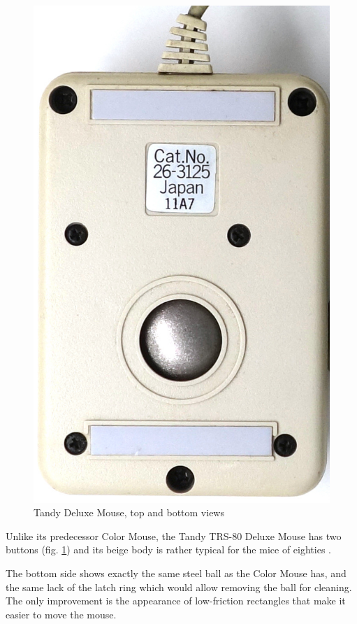 \documentclass[11pt, a4paper]{article}
\begin{document}
\begin{figure}[h]
    \includegraphics[scale=0.65]{1988_tandy_trs80_deluxe_mouse/bottom_30.jpg}
    \caption{Tandy Deluxe Mouse, top and bottom views}
    \label{fig:TandyDeluxeMouseTopAndBottom}
\end{figure}

Unlike its predecessor Color Mouse, the Tandy TRS-80 Deluxe Mouse has two buttons (fig. \ref{fig:TandyDeluxeMouseTopAndBottom}) and its beige body is rather typical for the mice of eighties \cite{hierophant}.

The bottom side shows exactly the same steel ball as the Color Mouse has, and the same lack of the latch ring which would allow removing the ball for cleaning. The only improvement is the appearance of low-friction rectangles that make it easier to move the mouse.
\end{document}
